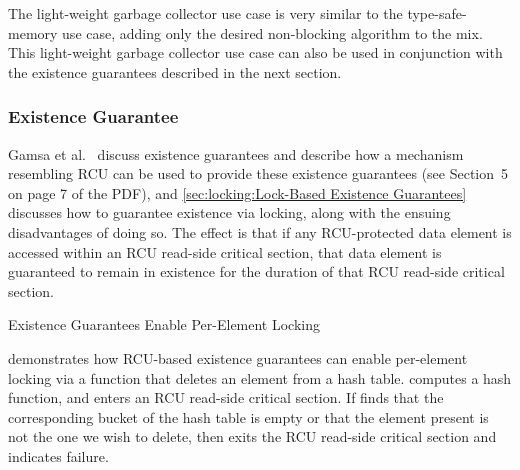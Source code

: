 The light-weight garbage collector use case is very similar to
the type-safe-memory use case, adding only the desired non-blocking
algorithm to the mix.
This light-weight garbage collector use case can also be used in
conjunction with the existence guarantees described in the next section.

\subsubsection{Existence Guarantee}
\label{sec:defer:Existence Guarantee}

Gamsa et al.~\cite{Gamsa99}
discuss existence guarantees and describe how a mechanism
resembling RCU can be used to provide these existence guarantees
(see Section~5 on page 7 of the PDF), and
\cref{sec:locking:Lock-Based Existence Guarantees}
discusses how to guarantee existence via locking, along with the
ensuing disadvantages of doing so.
The effect is that if any RCU-protected data element is accessed
within an RCU read-side critical section, that data element is
guaranteed to remain in existence for the duration of that RCU
read-side critical section.

\begin{listing}
\begin{fcvlabel}
\end{fcvlabel}
\caption{Existence Guarantees Enable Per-Element Locking}
\label{lst:defer:Existence Guarantees Enable Per-Element Locking}
\end{listing}

\begin{fcvref}
demonstrates how RCU-based existence guarantees can enable
per-element locking via a function that deletes an element from
a hash table.
 computes a hash function, and  enters an RCU
read-side critical section.
If  finds that the corresponding bucket of the hash table is
empty or that the element present is not the one we wish to delete,
then  exits the RCU read-side critical section and
indicates failure.
\end{fcvref}

